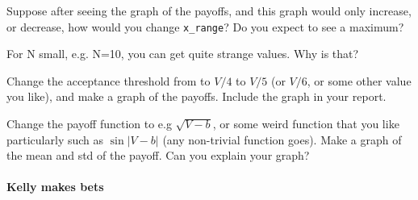 \documentclass[assignments]{subfiles}
\begin{document}
\begin{exercise}
Suppose after seeing the graph of the payoffs, and this graph would only increase, or decrease, how would you change \verb|x_range|? Do you expect to see a maximum?
\begin{solution}
\end{solution}
\end{exercise}




\begin{exercise}
For N small, e.g. N=10, you can get quite strange values. Why is that?
\begin{solution}
\end{solution}
\end{exercise}


\begin{exercise}
Change the acceptance threshold from to $V/4$ to $V/5$ (or $V/6$, or some other value you like), and make a graph of the payoffs.
Include the graph in your report.
\begin{solution}
\end{solution}
\end{exercise}

\begin{exercise}
Change the payoff function to e.g $\sqrt{V-b}$, or some weird function that you like particularly such as $\sin |V-b|$ (any non-trivial function goes).
Make a graph of the  mean and std of the payoff. Can you explain your graph?
\begin{solution}
\end{solution}
\end{exercise}

\paragraph{Kelly makes bets}
\end{document}
